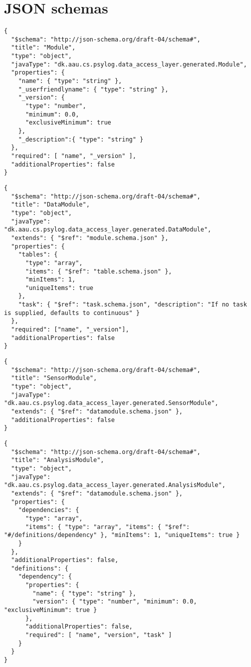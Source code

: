 \chapter{JSON schemas}\label{app:json_schema}

\begin{lstlisting}[caption=Module]
{
  "$schema": "http://json-schema.org/draft-04/schema#",
  "title": "Module",
  "type": "object",
  "javaType": "dk.aau.cs.psylog.data_access_layer.generated.Module",
  "properties": {
    "name": { "type": "string" },
    "_userfriendlyname": { "type": "string" },
    "_version": {
      "type": "number",
      "minimum": 0.0,
      "exclusiveMinimum": true
    },
    "_description":{ "type": "string" }
  },
  "required": [ "name", "_version" ],
  "additionalProperties": false
}
\end{lstlisting}

\begin{lstlisting}[caption=DataModule]
{
  "$schema": "http://json-schema.org/draft-04/schema#",
  "title": "DataModule",
  "type": "object",
  "javaType": "dk.aau.cs.psylog.data_access_layer.generated.DataModule",
  "extends": { "$ref": "module.schema.json" },
  "properties": {
    "tables": {
      "type": "array",
      "items": { "$ref": "table.schema.json" },
      "minItems": 1,
      "uniqueItems": true
    },
    "task": { "$ref": "task.schema.json", "description": "If no task is supplied, defaults to continuous" }
  },
  "required": ["name", "_version"],
  "additionalProperties": false
}
\end{lstlisting}

\begin{lstlisting}[caption=SensorModule]
{
  "$schema": "http://json-schema.org/draft-04/schema#",
  "title": "SensorModule",
  "type": "object",
  "javaType": "dk.aau.cs.psylog.data_access_layer.generated.SensorModule",
  "extends": { "$ref": "datamodule.schema.json" },
  "additionalProperties": false
}
\end{lstlisting}

\begin{lstlisting}[caption=AnalysisModule]
{
  "$schema": "http://json-schema.org/draft-04/schema#",
  "title": "AnalysisModule",
  "type": "object",
  "javaType": "dk.aau.cs.psylog.data_access_layer.generated.AnalysisModule",
  "extends": { "$ref": "datamodule.schema.json" },
  "properties": {
    "dependencies": {
      "type": "array",
      "items": { "type": "array", "items": { "$ref": "#/definitions/dependency" }, "minItems": 1, "uniqueItems": true }
    }
  },
  "additionalProperties": false,
  "definitions": {
    "dependency": {
      "properties": {
        "name": { "type": "string" },
        "version": { "type": "number", "minimum": 0.0, "exclusiveMinimum": true }
      },
      "additionalProperties": false,
      "required": [ "name", "version", "task" ]
    }
  }
}
\end{lstlisting}

